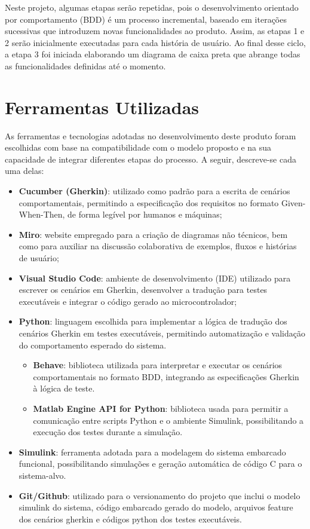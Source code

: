 Neste projeto, algumas etapas serão repetidas, pois o desenvolvimento orientado por comportamento (BDD) é um processo incremental, baseado em iterações 
sucessivas que introduzem novas funcionalidades ao produto. Assim, as etapas 1 e 2 serão inicialmente executadas para cada história de usuário. Ao final 
desse ciclo, a etapa 3 foi iniciada elaborando um diagrama de caixa preta que abrange todas as funcionalidades definidas até o momento.

\section{\textbf{Ferramentas Utilizadas}}
As ferramentas e tecnologias adotadas no desenvolvimento deste produto foram escolhidas com base na compatibilidade com o modelo proposto e na sua capacidade 
de integrar diferentes etapas do processo. A seguir, descreve-se cada uma delas:

\begin{itemize}
    \item \textbf{Cucumber (Gherkin)}: utilizado como padrão para a escrita de cenários comportamentais, permitindo a especificação dos requisitos no formato Given-When-Then, de forma legível por humanos e máquinas;
    \item \textbf{Miro}: website empregado para a criação de diagramas não técnicos, bem como para auxiliar na discussão colaborativa de exemplos, fluxos e histórias de usuário;
    \item \textbf{Visual Studio Code}: ambiente de desenvolvimento (IDE) utilizado para escrever os cenários em Gherkin, desenvolver a tradução para testes executáveis e integrar o código gerado ao microcontrolador;
    \item \textbf{Python}: linguagem escolhida para implementar a lógica de tradução dos cenários Gherkin em testes executáveis, permitindo automatização e validação do comportamento esperado do sistema.
    \begin{itemize}
        \item \textbf{Behave}: biblioteca utilizada para interpretar e executar os cenários comportamentais no formato BDD, integrando as especificações Gherkin à lógica de teste.
        \item \textbf{Matlab Engine API for Python}: biblioteca usada para permitir a comunicação entre scripts Python e o ambiente Simulink, possibilitando a execução dos testes durante a simulação.
    \end{itemize}    
    \item \textbf{Simulink}: ferramenta adotada para a modelagem do sistema embarcado funcional, possibilitando simulações e geração automática de código C para o sistema-alvo.
    \item \textbf{Git/Github}: utilizado para o versionamento do projeto que inclui o modelo simulink do sistema, código embarcado gerado do modelo, arquivos feature dos cenários gherkin e códigos python dos testes executáveis.

\end{itemize}

